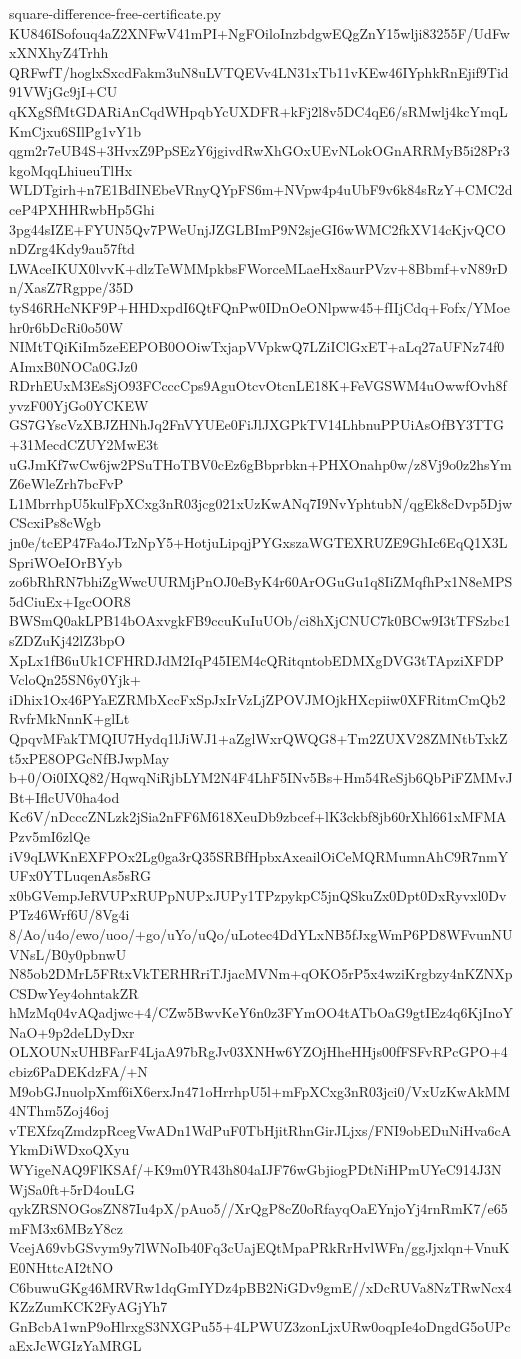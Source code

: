 \documentclass[11pt]{article}
\theoremstyle{definition}
\theoremstyle{remark}
\begin{document}
\begin{filecontents*}[overwrite]{square-difference-free-certificate.py}
KU846ISofouq4aZ2XNFwV41mPI+NgFOiloInzbdgwEQgZnY15wlji83255F/UdFwxXNXhyZ4Trhh
QRFwfT/hoglxSxcdFakm3uN8uLVTQEVv4LN31xTb11vKEw46IYphkRnEjif9Tid91VWjGc9jI+CU
qKXgSfMtGDARiAnCqdWHpqbYcUXDFR+kFj2l8v5DC4qE6/sRMwlj4kcYmqLKmCjxu6SIlPg1vY1b
qgm2r7eUB4S+3HvxZ9PpSEzY6jgivdRwXhGOxUEvNLokOGnARRMyB5i28Pr3kgoMqqLhiueuTlHx
WLDTgirh+n7E1BdINEbeVRnyQYpFS6m+NVpw4p4uUbF9v6k84sRzY+CMC2dceP4PXHHRwbHp5Ghi
3pg44sIZE+FYUN5Qv7PWeUnjJZGLBImP9N2sjeGI6wWMC2fkXV14cKjvQCOnDZrg4Kdy9au57ftd
LWAceIKUX0lvvK+dlzTeWMMpkbsFWorceMLaeHx8aurPVzv+8Bbmf+vN89rDn/XasZ7Rgppe/35D
tyS46RHcNKF9P+HHDxpdI6QtFQnPw0IDnOeONlpww45+fIIjCdq+Fofx/YMoehr0r6bDcRi0o50W
NIMtTQiKiIm5zeEEPOB0OOiwTxjapVVpkwQ7LZiIClGxET+aLq27aUFNz74f0AImxB0NOCa0GJz0
RDrhEUxM3EsSjO93FCcccCps9AguOtcvOtcnLE18K+FeVGSWM4uOwwfOvh8fyvzF00YjGo0YCKEW
GS7GYscVzXBJZHNhJq2FnVYUEe0FiJlJXGPkTV14LhbnuPPUiAsOfBY3TTG+31MecdCZUY2MwE3t
uGJmKf7wCw6jw2PSuTHoTBV0cEz6gBbprbkn+PHXOnahp0w/z8Vj9o0z2hsYmZ6eWleZrh7bcFvP
L1MbrrhpU5kulFpXCxg3nR03jcg021xUzKwANq7I9NvYphtubN/qgEk8cDvp5DjwCScxiPs8cWgb
jn0e/tcEP47Fa4oJTzNpY5+HotjuLipqjPYGxszaWGTEXRUZE9GhIc6EqQ1X3LSpriWOeIOrBYyb
zo6bRhRN7bhiZgWwcUURMjPnOJ0eByK4r60ArOGuGu1q8IiZMqfhPx1N8eMPS5dCiuEx+IgcOOR8
BWSmQ0akLPB14bOAxvgkFB9ccuKuIuUOb/ci8hXjCNUC7k0BCw9I3tTFSzbc1sZDZuKj42lZ3bpO
XpLx1fB6uUk1CFHRDJdM2IqP45IEM4cQRitqntobEDMXgDVG3tTApziXFDPVcloQn25SN6y0Yjk+
iDhix1Ox46PYaEZRMbXccFxSpJxIrVzLjZPOVJMOjkHXcpiiw0XFRitmCmQb2RvfrMkNnnK+glLt
QpqvMFakTMQIU7Hydq1lJiWJ1+aZglWxrQWQG8+Tm2ZUXV28ZMNtbTxkZt5xPE8OPGcNfBJwpMay
b+0/Oi0IXQ82/HqwqNiRjbLYM2N4F4LhF5INv5Bs+Hm54ReSjb6QbPiFZMMvJBt+IflcUV0ha4od
Kc6V/nDcccZNLzk2jSia2nFF6M618XeuDb9zbcef+lK3ckbf8jb60rXhl661xMFMAPzv5mI6zlQe
iV9qLWKnEXFPOx2Lg0ga3rQ35SRBfHpbxAxeailOiCeMQRMumnAhC9R7nmYUFx0YTLuqenAs5sRG
x0bGVempJeRVUPxRUPpNUPxJUPy1TPzpykpC5jnQSkuZx0Dpt0DxRyvxl0DvPTz46Wrf6U/8Vg4i
8/Ao/u4o/ewo/uoo/+go/uYo/uQo/uLotec4DdYLxNB5fJxgWmP6PD8WFvunNUVNsL/B0y0pbnwU
N85ob2DMrL5FRtxVkTERHRriTJjacMVNm+qOKO5rP5x4wziKrgbzy4nKZNXpCSDwYey4ohntakZR
hMzMq04vAQadjwc+4/CZw5BwvKeY6n0z3FYmOO4tATbOaG9gtIEz4q6KjInoYNaO+9p2deLDyDxr
OLXOUNxUHBFarF4LjaA97bRgJv03XNHw6YZOjHheHHjs00fFSFvRPcGPO+4cbiz6PaDEKdzFA/+N
M9obGJnuolpXmf6iX6erxJn471oHrrhpU5l+mFpXCxg3nR03jci0/VxUzKwAkMM4NThm5Zoj46oj
vTEXfzqZmdzpRcegVwADn1WdPuF0TbHjitRhnGirJLjxs/FNI9obEDuNiHva6cAYkmDiWDxoQXyu
WYigeNAQ9FlKSAf/+K9m0YR43h804aIJF76wGbjiogPDtNiHPmUYeC914J3NWjSa0ft+5rD4ouLG
qykZRSNOGosZN87Iu4pX/pAuo5//XrQgP8cZ0oRfayqOaEYnjoYj4rnRmK7/e65mFM3x6MBzY8cz
VcejA69vbGSvym9y7lWNoIb40Fq3cUajEQtMpaPRkRrHvlWFn/ggJjxlqn+VnuKE0NHttcAI2tNO
C6buwuGKg46MRVRw1dqGmIYDz4pBB2NiGDv9gmE//xDcRUVa8NzTRwNcx4KZzZumKCK2FyAGjYh7
GnBcbA1wnP9oHlrxgS3NXGPu55+4LPWUZ3zonLjxURw0oqpIe4oDngdG5oUPcaExJcWGIzYaMRGL

\end{filecontents*}
\end{document}
